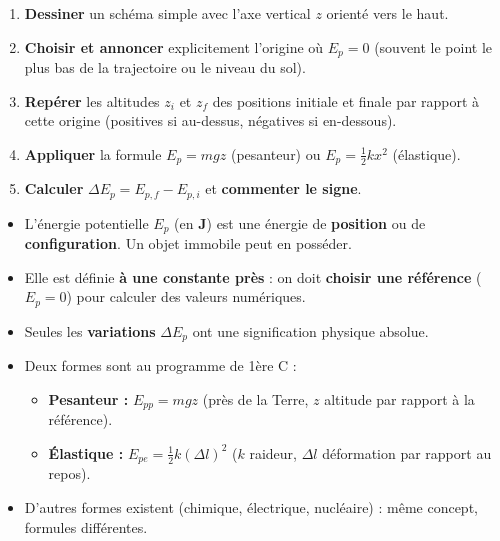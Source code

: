 \documentclass[11pt]{article}
\newcounter{popsec}
\newcounter{popsub}
\newcommand{\courssub}[1]{%
  \stepcounter{popsub}%
  \par\vspace{9pt}\noindent{\popxbold\fontsize{11.5}{13}\selectfont\color{popink}{\color{poporange}\thepopsec.\thepopsub}\hspace{6pt}#1}\par\nopagebreak\vspace{4pt}
}
\begin{document}
\begin{exoresolu}
\begin{methode}
\begin{enumerate}
    \item \textbf{Dessiner} un schéma simple avec l'axe vertical $z$ orienté vers le haut.
    \item \textbf{Choisir et annoncer} explicitement l'origine où $E_p = 0$ (souvent le point le plus bas de la trajectoire ou le niveau du sol).
    \item \textbf{Repérer} les altitudes $z_i$ et $z_f$ des positions initiale et finale par rapport à cette origine (positives si au-dessus, négatives si en-dessous).
    \item \textbf{Appliquer} la formule $E_p = mgz$ (pesanteur) ou $E_p = \frac{1}{2}kx^2$ (élastique).
    \item \textbf{Calculer} $\Delta E_p = E_{p,f} - E_{p,i}$ et \textbf{commenter le signe}.
\end{enumerate}
\end{methode}
\end{exoresolu}

\courssub{Bilan de la section}

\begin{aretenir}
\begin{itemize}
    \item L'énergie potentielle $E_p$ (en \textbf{J}) est une énergie de \textbf{position} ou de \textbf{configuration}. Un objet immobile peut en posséder.
    \item Elle est définie \textbf{à une constante près} : on doit \textbf{choisir une référence} ($E_p=0$) pour calculer des valeurs numériques.
    \item Seules les \textbf{variations} $\Delta E_p$ ont une signification physique absolue.
    \item Deux formes sont au programme de 1ère C :
    \begin{itemize}
        \item \textbf{Pesanteur :} $E_{pp} = mgz$ (près de la Terre, $z$ altitude par rapport à la référence).
        \item \textbf{Élastique :} $E_{pe} = \frac{1}{2}k(\Delta l)^2$ ($k$ raideur, $\Delta l$ déformation par rapport au repos).
    \end{itemize}
    \item D'autres formes existent (chimique, électrique, nucléaire) : même concept, formules différentes.
\end{itemize}
\end{aretenir}
\end{document}
